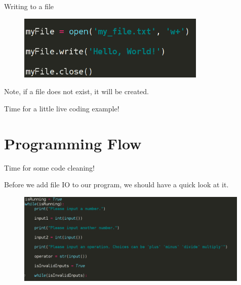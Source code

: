 \documentclass{beamer}
\begin{document}
\begin{frame}{Writing to a file}

\begin{figure}[h]
\includegraphics[width=0.8\textwidth]{filewrite}
\end{figure}

\pause

Note, if a file does not exist, it will be created.

\end{frame}

\begin{frame}

Time for a little live coding example!

\end{frame}

\section{Programming Flow}

\begin{frame}{Time for some code cleaning!}

Before we add file IO to our program, we should have a quick look at it.

\end{frame}

\begin{frame}
\begin{figure}[h]
\includegraphics[width=0.99\textwidth]{inputsnip}
\end{figure}
\end{frame}
\end{document}
